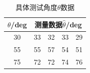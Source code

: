 \documentclass[scheme=chinese,a4paper]{article}
\begin{document}
\begin{appendices}
\begin{table}[htbp]
  \centering
  \caption{具体测试角度$\theta$数据}
  \begin{tabular}{cp{0.5cm}p{0.5cm}p{0.5cm}p{0.5cm}}
  \hline
    $\theta$/deg & \multicolumn{4}{c}{测量数据$\hat{\theta}$/deg}  \\ \hline
    30 & 33 & 32 & 33 & 29 \\
    55 & 55 &  57       & 54        & 51   \\
    75 & 72 &  72       & 74        & 76   \\\hline
  \end{tabular}
\end{table} 

\end{appendices}
\end{document}
